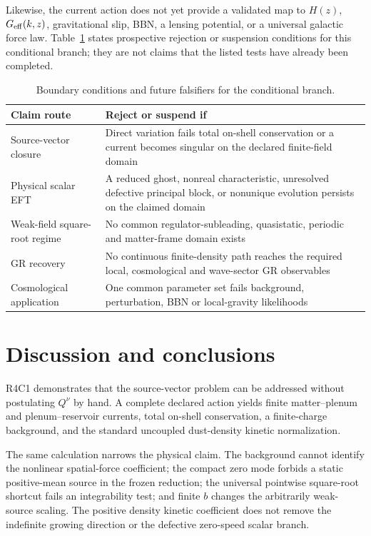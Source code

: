 \documentclass[aps,prd,reprint,superscriptaddress,nofootinbib,floatfix]{revtex4-2}
\begin{document}
Likewise, the current action does not yet provide a validated map to
\(H(z)\), \(G_{\rm eff}(k,z)\), gravitational slip, BBN, a lensing potential,
or a universal galactic force law.  Table~\ref{tab:falsifiers} states
prospective rejection or suspension conditions for this conditional branch;
they are not claims that the listed tests have already been completed.

\begin{table}[t]
\caption{Boundary conditions and future falsifiers for the conditional branch.}
\label{tab:falsifiers}
\begin{ruledtabular}
\begin{tabular}{p{}p{}}
Claim route & Reject or suspend if \\
\hline
Source-vector closure & Direct variation fails total on-shell conservation or
a current becomes singular on the declared finite-field domain \\
Physical scalar EFT & A reduced ghost, nonreal characteristic, unresolved
defective principal block, or nonunique evolution persists on the claimed
domain \\
Weak-field square-root regime & No common regulator-subleading,
quasistatic, periodic and matter-frame domain exists \\
GR recovery & No continuous finite-density path reaches the required local,
cosmological and wave-sector GR observables \\
Cosmological application & One common parameter set fails background,
perturbation, BBN or local-gravity likelihoods \\
\end{tabular}
\end{ruledtabular}
\end{table}

\section{Discussion and conclusions}
\label{sec:conclusion}

R4C1 demonstrates that the source-vector problem can be addressed without
postulating \(Q^\nu\) by hand.  A complete declared action yields finite
matter--plenum and plenum--reservoir currents, total on-shell conservation, a
finite-charge background, and the standard uncoupled dust-density kinetic
normalization.

The same calculation narrows the physical claim.  The background cannot
identify the nonlinear spatial-force coefficient; the compact zero mode
forbids a static positive-mean source in the frozen reduction; the universal
pointwise square-root shortcut fails an integrability test; and finite \(b\)
changes the arbitrarily weak-source scaling.  The positive density kinetic
coefficient does not remove the indefinite growing direction or the defective
zero-speed scalar branch.
\end{document}
